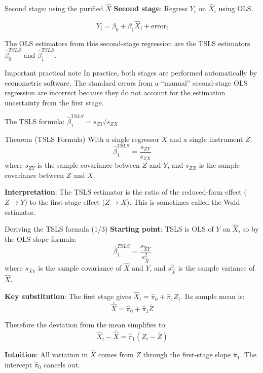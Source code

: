 \documentclass[10pt]{beamer}
\begin{document}
\begin{frame}{Second stage: using the purified $\widehat{X}$}
\label{slide:second_stage}
\textbf{Second stage}: Regress $Y_i$ on $\widehat{X}_i$ using OLS.

\[
Y_i = \beta_0 + \beta_1 \widehat{X}_i + \text{error}_i
\]

The OLS estimators from this second-stage regression are the TSLS estimators $\widehat{\beta}_0^{TSLS}$ and $\widehat{\beta}_1^{TSLS}$.

\pause
\vspace{1em}
\begin{alertblock}{Important practical note}
In practice, both stages are performed automatically by econometric software. The standard errors from a ``manual'' second-stage OLS regression are \alert{incorrect} because they do not account for the estimation uncertainty from the first stage.
\end{alertblock}
\end{frame}

\begin{frame}{The TSLS formula: $\widehat{\beta}_1^{TSLS} = s_{ZY}/s_{ZX}$}
\label{slide:tsls_formula}
\begin{block}{Theorem (TSLS Formula)}
With a single regressor $X$ and a single instrument $Z$:
\[
\widehat{\beta}_1^{TSLS} = \frac{s_{ZY}}{s_{ZX}}
\]
where $s_{ZY}$ is the sample covariance between $Z$ and $Y$, and $s_{ZX}$ is the sample covariance between $Z$ and $X$.
\end{block}

\pause
\textbf{Interpretation}: The TSLS estimator is the ratio of the reduced-form effect ($Z \to Y$) to the first-stage effect ($Z \to X$). This is sometimes called the \alert{Wald estimator}.
\end{frame}

\begin{frame}{Deriving the TSLS formula (1/3)}
\label{slide:tsls_derivation}
\textbf{Starting point}: TSLS is OLS of $Y$ on $\widehat{X}$, so by the OLS slope formula:
\[
\widehat{\beta}_1^{TSLS} = \frac{s_{\widehat{X}Y}}{s_{\widehat{X}}^2}
\]
where $s_{\widehat{X}Y}$ is the sample covariance of $\widehat{X}$ and $Y$, and $s_{\widehat{X}}^2$ is the sample variance of $\widehat{X}$.

\pause
\vspace{0.5em}
\textbf{Key substitution}: The first stage gives $\widehat{X}_i = \widehat{\pi}_0 + \widehat{\pi}_1 Z_i$. Its sample mean is:
\[
\bar{\widehat{X}} = \widehat{\pi}_0 + \widehat{\pi}_1 \bar{Z}
\]

\pause
Therefore the deviation from the mean simplifies to:
\[
\boxed{\widehat{X}_i - \bar{\widehat{X}} = \widehat{\pi}_1(Z_i - \bar{Z})}
\]

\vspace{0.3em}
\textbf{Intuition}: All variation in $\widehat{X}$ comes from $Z$ through the first-stage slope $\widehat{\pi}_1$. The intercept $\widehat{\pi}_0$ cancels out.
\end{frame}
\end{document}

